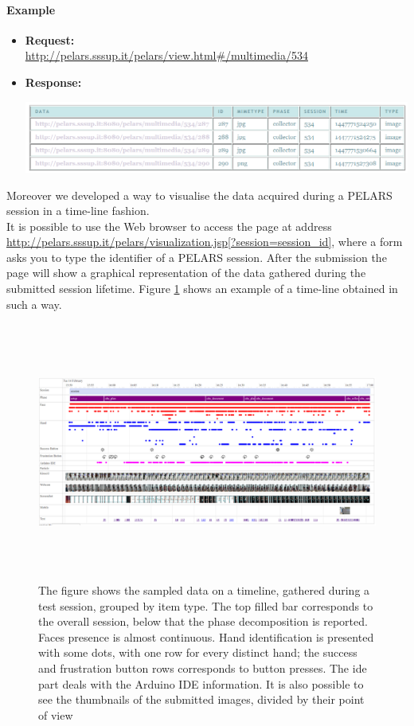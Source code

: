 \documentclass[a4paper,notitlepage,onecolumn]{hitec}  %
\begin{document}
\paragraph{Example}
\begin{itemize}
\item\textbf{Request:} \\
\url{http://pelars.sssup.it/pelars/view.html#/multimedia/534}

\item\textbf{Response:}
\begin{center}
\hspace*{-3.3cm}
\includegraphics[scale=0.47]{multimedias.png}
\end{center}
\end{itemize}
Moreover we developed a way to visualise the data acquired during a PELARS session in a time-line fashion. \\It is possible to use the Web browser to access the page at address \url{http://pelars.sssup.it/pelars/visualization.jsp[?session=session\_id]}, where a form asks you to type the identifier of a PELARS session. After the submission the page will show a graphical representation of the data gathered during the submitted session lifetime. Figure \ref{fig:fullsession} shows an example of a time-line obtained in such a way.

\begin{figure}[h]
\hspace*{-3.3cm}
\includegraphics[width=18.5cm, height=8.5cm]{fullsession.png}
\caption{The figure shows the sampled data on a timeline, gathered during a test session, grouped by item type. The top filled bar corresponds to the overall session, below that the phase decomposition is reported. Faces presence is almost continuous. Hand identification is presented with some dots, with one row for every distinct hand; the success and frustration button rows corresponds to button presses. The ide part deals with the Arduino IDE information. It is also possible to see the thumbnails of the submitted images, divided by their point of view}
\label{fig:fullsession}
\end{figure}
\end{document}
